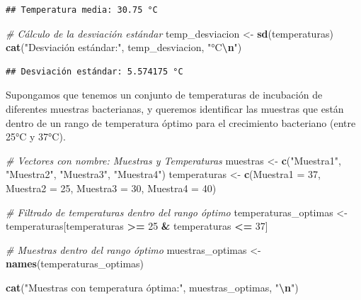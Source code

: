 \documentclass[
]{book}
\newenvironment{Shaded}{\begin{snugshade}}{\end{snugshade}}
\newcommand{\AttributeTok}[1]{\textcolor[rgb]{0.13,0.29,0.53}{#1}}
\newcommand{\CommentTok}[1]{\textcolor[rgb]{0.56,0.35,0.01}{\textit{#1}}}
\newcommand{\DecValTok}[1]{\textcolor[rgb]{0.00,0.00,0.81}{#1}}
\newcommand{\FunctionTok}[1]{\textcolor[rgb]{0.13,0.29,0.53}{\textbf{#1}}}
\newcommand{\NormalTok}[1]{#1}
\newcommand{\OtherTok}[1]{\textcolor[rgb]{0.56,0.35,0.01}{#1}}
\newcommand{\SpecialCharTok}[1]{\textcolor[rgb]{0.81,0.36,0.00}{\textbf{#1}}}
\newcommand{\StringTok}[1]{\textcolor[rgb]{0.31,0.60,0.02}{#1}}
\begin{document}
\begin{verbatim}
## Temperatura media: 30.75 °C
\end{verbatim}

\begin{Shaded}
\begin{Highlighting}[]
\CommentTok{\# Cálculo de la desviación estándar}
\NormalTok{temp\_desviacion }\OtherTok{\textless{}{-}} \FunctionTok{sd}\NormalTok{(temperaturas)}
\FunctionTok{cat}\NormalTok{(}\StringTok{"Desviación estándar:"}\NormalTok{, temp\_desviacion, }\StringTok{"°C}\SpecialCharTok{\textbackslash{}n}\StringTok{"}\NormalTok{)}
\end{Highlighting}
\end{Shaded}

\begin{verbatim}
## Desviación estándar: 5.574175 °C
\end{verbatim}

Supongamos que tenemos un conjunto de temperaturas de incubación de diferentes muestras bacterianas, y queremos identificar las muestras que están dentro de un rango de temperatura óptimo para el crecimiento bacteriano (entre 25°C y 37°C).

\begin{Shaded}
\begin{Highlighting}[]
\CommentTok{\# Vectores con nombre: Muestras y Temperaturas}
\NormalTok{muestras }\OtherTok{\textless{}{-}} \FunctionTok{c}\NormalTok{(}\StringTok{"Muestra1"}\NormalTok{, }\StringTok{"Muestra2"}\NormalTok{, }\StringTok{"Muestra3"}\NormalTok{, }\StringTok{"Muestra4"}\NormalTok{)}
\NormalTok{temperaturas }\OtherTok{\textless{}{-}} \FunctionTok{c}\NormalTok{(}\AttributeTok{Muestra1 =} \DecValTok{37}\NormalTok{, }\AttributeTok{Muestra2 =} \DecValTok{25}\NormalTok{, }\AttributeTok{Muestra3 =} \DecValTok{30}\NormalTok{, }\AttributeTok{Muestra4 =} \DecValTok{40}\NormalTok{)}

\CommentTok{\# Filtrado de temperaturas dentro del rango óptimo}
\NormalTok{temperaturas\_optimas }\OtherTok{\textless{}{-}}\NormalTok{ temperaturas[temperaturas }\SpecialCharTok{\textgreater{}=} \DecValTok{25} \SpecialCharTok{\&}\NormalTok{ temperaturas }\SpecialCharTok{\textless{}=} \DecValTok{37}\NormalTok{]}

\CommentTok{\# Muestras dentro del rango óptimo}
\NormalTok{muestras\_optimas }\OtherTok{\textless{}{-}} \FunctionTok{names}\NormalTok{(temperaturas\_optimas)}

\FunctionTok{cat}\NormalTok{(}\StringTok{"Muestras con temperatura óptima:"}\NormalTok{, muestras\_optimas, }\StringTok{"}\SpecialCharTok{\textbackslash{}n}\StringTok{"}\NormalTok{)}
\end{Highlighting}
\end{Shaded}
\end{document}

